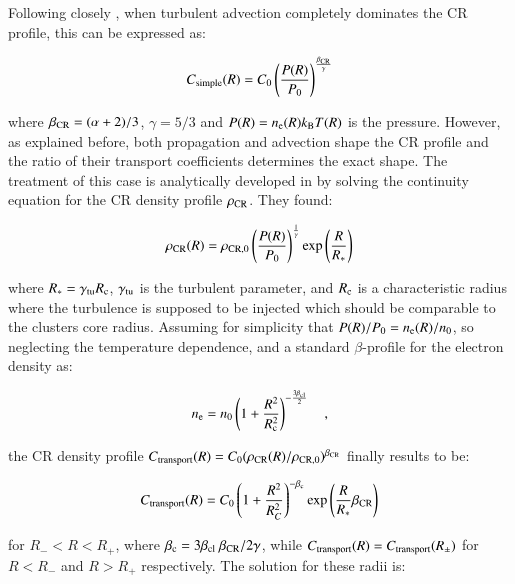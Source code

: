 \documentclass[traditabstract]{aa}
\newcommand{\rmn}{\mathrm}
\begin{document}
Following closely \cite{2011A&A...527A..99E}, when turbulent advection completely dominates the CR profile, this can be expressed as:

\begin{equation}
C_{\rm{simple}}(R) = C_{0} \left( \frac{P(R)}{P_{0}} \right)^{\frac{\beta_{\rm{CR}}}{\gamma}}
\label{eq:Csimple}
\end{equation} 

where $\beta_{\rm{CR}}=(\alpha+2)/3$, $\gamma=5/3$ and $P(R)=n_{\rm{e}}(R) k_{\rm{B}} T(R)$ is the pressure. However, as explained before, both propagation and advection shape the CR profile and the ratio of their transport coefficients determines the exact shape. The treatment of this case is analytically developed in \cite{2011A&A...527A..99E} by solving the continuity equation for the CR density profile $\rho_{\rm{CR}}$. They found:

\begin{equation}
\rho_{\rm{CR}}(R) = \rho_{\rm{CR},0} \left( \frac{P(R)}{P_{0}} \right)^{\frac{1}{\gamma}} \rmn{exp} \left( \frac{R}{R_{*}} \right)
\label{eg:rhoCR}
\end{equation} 

where $R_{*}=\gamma_{\rm{\rm{tu}}}R_{\rm{c}}$, $\gamma_{\rm{tu}}$ is the turbulent parameter, and $R_{\rm{c}}$ is a characteristic radius where the turbulence is supposed to be injected which should be comparable to the clusters core radius. Assuming for simplicity that $P(R)/P_{0}=n_{\rm{e}}(R)/n_{0}$, so neglecting the temperature dependence, and a standard $\beta$-profile for the electron density as:

\begin{equation}
n_{\rm{e}} = n_{0} \left( 1+\frac{R^{2}}{R_{\rm{c}}^{2}} \right)^{-\frac{3\beta_{\rm{cl}}}{2}} \quad ,
\label{eq:beta_profile}
\end{equation} 

the CR density profile $C_{\rm{transport}}(R)=C_{0}(\rho_{\rm{CR}}(R)/\rho_{\rm{CR},0})^{\beta_{\rm{CR}}}$ finally results to be:

\begin{equation}
C_{\rm{transport}}(R) = C_{0}\left( 1+ \frac{R^{2}}{R_{C}^{2}} \right)^{-\beta_{\rm{c}}} \rmn{exp}\left( {\frac{R}{R_{*}}\beta_{\rm{CR}}} \right)
\label{eq:Ctransport}
\end{equation} 

for $R_{-}<R<R_{+}$, where $\beta_{\rm{c}}=3\beta_{\rm{cl}}~\beta_{\rm{CR}}/2\gamma$, while $C_{\rm{transport}}(R) = C_{\rm{transport}}(R_{\pm})$ for $R<R_{-}$ and $R>R_{+}$ respectively. The solution for these radii is:
\end{document}

